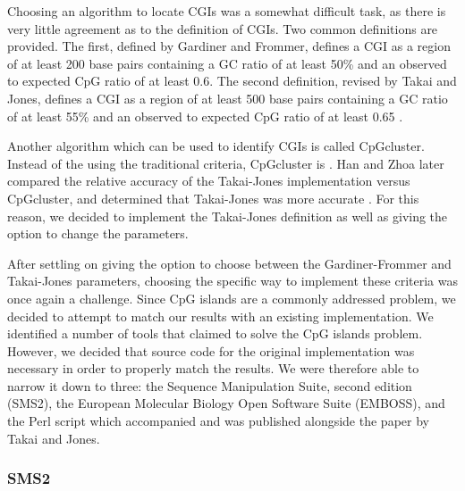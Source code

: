 \documentclass{bioinfo}
\begin{document}
Choosing an algorithm to locate CGIs was a somewhat difficult
task, as there is very little agreement as to the definition of
CGIs. Two common definitions are provided. The first, defined by
Gardiner and Frommer, defines a CGI as a region of at least 200 base
pairs containing a GC ratio of at least 50\% and an observed to
expected CpG ratio of at least 0.6. The second definition, revised by
Takai and Jones, defines a CGI as a region of at least 500 base pairs containing a GC ratio of at least 55\% and an observed to
expected CpG ratio of at least 0.65 \citep{pmid11891299}.

Another algorithm which can be used to identify CGIs is called
CpGcluster. Instead of the using the traditional criteria, CpGcluster
is . Han and Zhoa later
compared the relative accuracy of the Takai-Jones implementation
versus CpGcluster, and determined that Takai-Jones was more accurate
\citep{pmid19232104}. For this reason, we decided to implement the
Takai-Jones definition as well as giving the option to change the
parameters.

After settling on giving the option to choose between the
Gardiner-Frommer and Takai-Jones parameters, choosing the specific way
to implement these criteria was once again a challenge. Since CpG
islands are a commonly addressed problem, we decided to attempt to
match our results with an existing implementation. We identified a
number of tools that claimed to solve the CpG islands
problem. However, we decided that source code for the original
implementation was necessary in order to properly match the
results. We were therefore able to narrow it down to three: the
Sequence Manipulation Suite, second edition (SMS2), the European
Molecular Biology Open Software Suite (EMBOSS), and the Perl script
which accompanied and was published alongside the paper by Takai and
Jones.

\subsubsection{SMS2}
\end{document}
